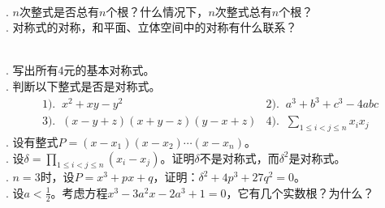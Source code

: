 \documentclass[12pt,UTF8,fontset=none]{ctexbook}
\begin{document}



\begin{sk}
    \mbox{} \\
    . $n$次整式是否总有$n$个根？什么情况下，$n$次整式总有$n$个根？\\
    . 对称式的对称，和平面、立体空间中的对称有什么联系？

\end{sk}

\begin{xt}
    \mbox{} \\
    . 写出所有$4$元的基本对称式。\\
    . 判断以下整式是否是对称式。\\
    $$
    \begin{array}{ll}
       1).\;\; x^2 + xy - y^2 & 2).\;\; a^3 + b^3 + c^3 - 4abc \\
       3).\;\;  (x - y + z)(x + y - z)(y - x + z) & 4).\;\; \displaystyle\sum_{1\leqslant i < j \leqslant n} x_i x_j
    \end{array}
    $$
    . 设有整式$P = (x - x_1)(x - x_2) \cdots (x - x_n)$。\\
    . 设$\displaystyle\delta = \prod_{1\leqslant i < j \leqslant n} (x_i - x_j)$。证明$\delta$不是对称式，而$\delta^2$是对称式。\\
    . $n=3$时，设$P = x^3 + px + q$，证明：$\delta^2 + 4p^3 + 27 q^2 = 0$。\\
    . 设$a<\frac{1}{2}$。考虑方程$x^3 - 3a^2x - 2a^3 + 1 = 0$，它有几个实数根？为什么？
\end{xt}
\end{document}
